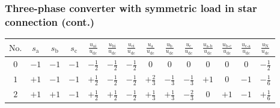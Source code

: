 \begin{frame}[b]
    \frametitle{Three-phase converter with symmetric load in star connection (cont.)}
    \vspace{1em}
    \begin{table}
        \renewcommand{\arraystretch}{1.25}
        \centering
        \begin{tabular}{c c c c c c c c c c c c c c}
            \toprule
            $\mathrm{No.}$ & $s_\mathrm{a}$ & $s_\mathrm{b}$ & $s_\mathrm{c}$ & $\frac{u_{\mathrm{ai}}}{u_\mathrm{dc}}$ & $\frac{u_{\mathrm{bi}}}{u_\mathrm{dc}}$ & $\frac{u_{\mathrm{ci}}}{u_\mathrm{dc}}$ & $\frac{u_{\mathrm{a}}}{u_\mathrm{dc}}$ & $\frac{u_{\mathrm{b}}}{u_\mathrm{dc}}$ & $\frac{u_{\mathrm{c}}}{u_\mathrm{dc}}$ & $\frac{u_{\mathrm{a\text{-}b}}}{u_\mathrm{dc}}$ & $\frac{u_{\mathrm{b\text{-}c}}}{u_\mathrm{dc}}$ & $\frac{u_{\mathrm{c\text{-}a}}}{u_\mathrm{dc}}$ & $\frac{u_{\mathrm{N}}}{u_\mathrm{dc}}$ \\
            \midrule
            $0$            & $-1$           & $-1$           & $-1$           & $-\frac{1}{2}$                          & $-\frac{1}{2}$                          & $-\frac{1}{2}$                          & $0$                                    & $0$                                    & $0$                                    & $0$                                             & $0$                                             & $0$                                             & $-\frac{1}{2}$                         \\

            $1$            & $+1$           & $-1$           & $-1$           & $+\frac{1}{2}$                          & $-\frac{1}{2}$                          & $-\frac{1}{2}$                          & $+\frac{2}{3}$                         & $-\frac{1}{3}$                         & $-\frac{1}{3}$                         & $+1$                                            & $0$                                             & $-1$                                            & $-\frac{1}{6}$                         \\

            $2$            & $+1$           & $+1$           & $-1$           & $+\frac{1}{2}$                          & $+\frac{1}{2}$                          & $-\frac{1}{2}$                          & $+\frac{1}{3}$                         & $+\frac{1}{3}$                         & $-\frac{2}{3}$                         & $0$                                             & $+1$                                            & $-1$                                            & $+\frac{1}{6}$                         \\


\end{tabular}
\end{table}
\end{frame}
